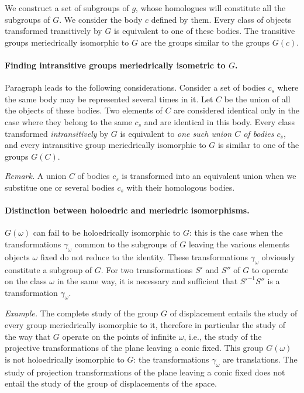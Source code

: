 We construct a set of subgroups of $g$, whose homologues will constitute all the subgroups of $G$. We consider the body $c$ defined by them. Every class of objects transformed transitively by $G$ is equivalent to one of these bodies. The transitive groups meriedrically isomorphic to $G$ are the groups similar to the groups $G(c)$.

\paragraph{Finding intransitive groups meriedrically isometric to $G$.}
\label{sec:96}
Paragraph  leads to the following considerations. Consider a set of bodies $c_{s}$ where the same body may be represented several times in it. Let $C$ be the union of all the objects of these bodies. Two elements of $C$ are considered identical only in the case where they belong to the same $c_{s}$ and are identical in this body. Every class transformed \emph{intransitively} by $G$ is equivalent to \emph{one such union $C$ of bodies $c_{s}$}, and every intransitive group meriedrically isomorphic to $G$ is similar to one of the groups $G(C)$.

\somespace

\emph{Remark.} A union $C$ of bodies $c_{s}$ is transformed into an equivalent union when we substitue one or several bodies $c_{s}$ with their homologous bodies.


\paragraph{Distinction between holoedric and meriedric isomorphisms.}
\label{sec:97}
$G(\omega)$ can fail to be holoedrically isomorphic to $G$: this is the case when the transformations $\gamma_{\omega}$ common to the subgroups of $G$ leaving the various elements objects $\omega$ fixed do not reduce to the identity. These transformations $\gamma_{\omega}$ obviously constitute a subgroup of $G$. For two transformations $S'$ and $S''$ of $G$ to operate on the class $\omega$ in the same way, it is necessary and sufficient that $S'^{-1}S''$ is a transformation $\gamma_{\omega}$.

\somespace

{\small
\emph{Example.} The complete study of the group $G$ of displacement entails the study of every group meriedrically isomorphic to it, therefore in particular the study of the way that $G$ operate on the points of infinite $\omega$, i.e., the study of the projective transformations of the plane leaving a conic fixed. This group $G(\omega)$ is not holoedrically isomorphic to $G$: the transformations $\gamma_{\omega}$ are translations. The study of projection transformations of the plane leaving a conic fixed does not entail the study of the group of displacements of the space.
}

